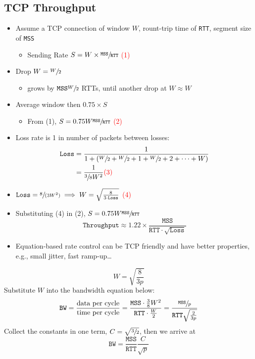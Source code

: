 \subsection{TCP Throughput}
\begin{itemize}[nosep]
    \item Assume a TCP connection of window $W$, rount-trip time of \texttt{RTT}, segment size of \texttt{MSS}
          \begin{itemize}[nosep]
              \item Sending Rate $S = W \times \sfrac{\texttt{MSS}}{\texttt{RTT}}$ \textcolor{red}{(1)}
          \end{itemize}
    \item Drop $W = \sfrac{W}{2}$
          \begin{itemize}[nosep]
              \item grows by $\texttt{MSS} \sfrac{W}{2}$ RTTs, until another drop at $W\approx W$
          \end{itemize}
    \item Average window then $0.75\times S$
          \begin{itemize}[nosep]
              \item From (1), $S = 0.75 W \sfrac{\texttt{MSS}}{\texttt{RTT}}$ \textcolor{red}{(2)}
          \end{itemize}
    \item Loss rate is 1 in number of packets between losses:
          \begin{align*}\texttt{Loss} &= \frac{1}{1+\left(\sfrac{W}{2} + \sfrac{W}{2} + 1 + \sfrac{W}{2} + 2 + \dots + W\right)}\\&=\frac{1}{\sfrac{3}{8}W^2}\textcolor{red}{(3)}\end{align*}
    \item $\texttt{Loss} = \sfrac{8}{(3W^2)} \implies W = \sqrt{\frac{8}{3\cdot\texttt{Loss}}}$ \textcolor{red}{(4)}
    \item Substituting (4) in (2), $S = 0.75 W \sfrac{\texttt{MSS}}{\texttt{RTT}}$
          \[\texttt{Throughput} \approx 1.22\times\frac{\texttt{MSS}}{\texttt{RTT}\cdot\sqrt{\texttt{Loss}}}\]
    \item Equation-based rate control can be TCP friendly and have better properties, e.g., small jitter, fast ramp-up\dots
\end{itemize}

\[W = \sqrt{\frac{8}{3p}}\]
Substitute $W$ into the bandwidth equation below:
\[\texttt{BW} = \frac{\text{data per cycle}}{\text{time per cycle}} = \frac{\texttt{MSS}\cdot\frac{3}{8}W^2}{\texttt{RTT}\cdot\frac{W}{2}} = \frac{\sfrac{\texttt{MSS}}{p}}{\texttt{RTT}\sqrt{\frac{2}{3p}}}\]
Collect the constants in one term, $C=\sqrt{\sfrac{3}{2}}$, then we arrive at
\[\texttt{BW} = \frac{\texttt{MSS}}{\texttt{RTT}}\frac{C}{\sqrt{p}}\]

